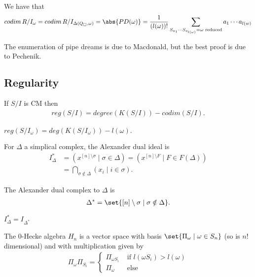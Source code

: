 \begin{corollary}
We have that
    \begin{align*}
        codim \,R / I_\omega  = codim \, R/ I_{\Delta (Q_\square , \omega) } = \abs{ PD(\omega)} = \frac{1}{(l(\omega ))!} \sum_{S_{a_{1}} \cdots S_{a_{l(\omega)} } = \omega \text{ reduced} } a_1 \cdots a_{l(w)} 
    \end{align*}
\end{corollary}

The enumeration of pipe dreams is due to Macdonald, but the best proof is due to Pechenik.

\subsection{Regularity}

\begin{theorem}
    If $S/ I$ is CM then
    \begin{align*}
        reg (S/I ) = degree (K( S/I) ) - codim (S/I).
    \end{align*}
\end{theorem}

\begin{corollary}
    $reg (S/I_\omega) = deg( K(S/I_\omega) ) - l(\omega)$.
\end{corollary}

\begin{definition}
    For $\Delta $ a simplical complex, the Alexander dual ideal is 
    \begin{align*}
        I_\Delta^* &= ( x^{[n] \setminus \sigma } \mid \sigma \in \Delta  ) = ( x^{[n] \setminus F } \mid F \in F(\Delta ) )\\
        &= \bigcap_{\sigma \notin \Delta } (x_i \mid i \in \sigma).
    \end{align*} 
\end{definition}

\begin{definition}
    The Alexander dual complex to $\Delta$ is
    \begin{align*}
        \Delta^* = \set{ [n] \setminus \sigma \mid \sigma \notin \Delta}.
    \end{align*}
\end{definition}

\begin{lemma}
    $I_\Delta^* = I_{\Delta^*}$
\end{lemma}

\begin{definition}
    The $0$-Hecke algebra $H_n$ is a vector space with basis $\set{ \Pi_\omega \mid \omega \in S_n}$ (so is $n!$ dimensional) and with multiplication given by
    \begin{align*}
        \Pi_\omega \Pi_{S_i} =
        \begin{cases}
            \Pi_{\omega S_i} & \text{ if } l(\omega S_i ) > l(\omega)\\
            \Pi_\omega & \text{ else}
        \end{cases}
    \end{align*}
\end{definition}

